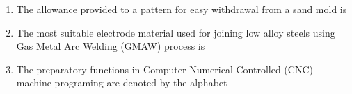\documentclass[journal]{IEEEtran}
\begin{document}
\begin{enumerate}[leftmargin=0pt]
\hfill{}

\item
The allowance provided to a pattern for easy withdrawal from a sand mold is

\vspace{2mm}

\begin{enumerate}
\end{enumerate}

\hfill{}

\vspace{4mm}

\item
The most suitable electrode material used for joining low alloy steels using Gas Metal Arc Welding (GMAW) process is

\vspace{2mm}

\begin{enumerate}
\end{enumerate}

\hfill{}

\vspace{4mm}

\item
The preparatory functions in Computer Numerical Controlled (CNC) machine programing are denoted by the alphabet

\vspace{2mm}

\begin{enumerate}
\end{enumerate}


\end{enumerate}
\end{document}

